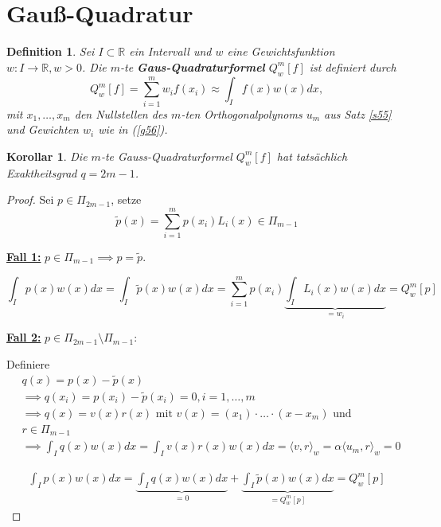 \documentclass{book}
\newtheorem{corollary}[algorithm]{Korollar}
\newtheorem{definition}[algorithm]{Definition}
\def\R{\mathbb{R}}
\begin{document}
        \section{Gauß-Quadratur}

            \begin{definition}\label{d510}
                Sei $I\subset\R$ ein Intervall und $w$ eine Gewichtsfunktion $w:I\to\R,w>0$. Die $m$-te \textbf{Gaus-Quadraturformel}
                $Q_w^m[f]$ ist definiert durch 
                \begin{equation*}
                    Q_w^m[f]=\sum_{i=1}^m w_if(x_i)\approx \int_I f(x)w(x)dx,
                \end{equation*}
                mit $x_1,\dots,x_m$ den Nullstellen des $m$-ten Orthogonalpolynoms $u_m$ aus Satz \ref{s55} und Gewichten 
                $w_i$ wie in (\ref{g56}).
            \end{definition}

            \begin{corollary}\label{k511}
                Die $m$-te Gauss-Quadraturformel $Q_w^m[f]$ hat tatsächlich Exaktheitsgrad $q=2m-1$.
            \end{corollary}

            \begin{proof}
                Sei $p\in \Pi_{2m-1}$, setze 
                \[\tilde{p}(x)=\sum_{i=1}^m p(x_i)L_i(x)\in\Pi_{m-1}\]

                \underline{\textbf{Fall 1:}} $p\in \Pi_{m-1}\implies p=\tilde{p}$.

                \begin{equation*}
                    \int_Ip(x)w(x)dx=\int_I\tilde{p}(x)w(x)dx = \sum_{i=1}^m p(x_i)\underbrace{\int_I L_i(x)w(x)dx}_{=w_i}=Q_w^m[p]
                \end{equation*}

                \underline{\textbf{Fall 2:}} $p\in \Pi_{2m-1}\setminus\Pi_{m-1}$:

                Definiere 
                \begin{align*}
                    &q(x)=p(x)-\tilde{p}(x)\\
                    &\implies q(x_i)=p(x_i)-\tilde{p}(x_i)=0, i=1,\dots,m\\
                    &\implies q(x)=v(x)r(x) \text{ mit } v(x)=(x_1)\cdot\dots\cdot(x-x_m) \text{ und }\\
                    &r\in\Pi_{m-1}\\
                    &\implies \int_I q(x)w(x)dx =\int_I v(x)r(x)w(x)dx=\langle v,r \rangle_w=\alpha \langle u_m,r \rangle_w=0
                \end{align*}

                \begin{align*}
                    \int_I p(x)w(x)dx=\underbrace{\int_I q(x)w(x)dx}_{=0} + \underbrace{\int_I \tilde{p}(x)w(x)dx}_{=Q_w^m[p]}=Q_w^m[p]
                \end{align*}
            \end{proof}
\end{document}
